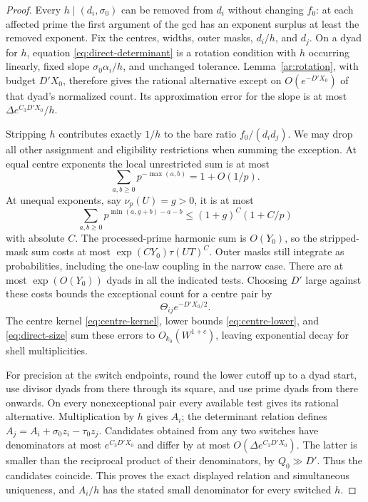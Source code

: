 \begin{proof}
Every $h\mid(d_i,\sigma_0)$ can be removed from $d_i$ without changing
$f_0$: at each affected prime the first argument of the gcd has an exponent
surplus at least the removed exponent. Fix the centres, widths, outer
masks, $d_i/h$, and $d_j$. On a dyad for $h$, equation
\eqref{eq:direct-determinant} is a rotation condition with $h$ occurring
linearly, fixed slope $\sigma_0\alpha_i/h$, and unchanged tolerance.
Lemma~\ref{ar:rotation}, with budget $D'X_0$, therefore gives the
rational alternative except on $O(e^{-D'X_0})$ of that dyad's normalized
count. Its approximation error for the slope is at most
$\Delta e^{C_3D'X_0}/h$.

Stripping $h$ contributes exactly $1/h$ to the bare ratio
$f_0/(d_i d_j)$. We may drop all other assignment and eligibility
restrictions when summing the exception. At equal centre exponents the
local unrestricted sum is at most
\[
 \sum_{a,b\ge0}p^{-\max(a,b)}=1+O(1/p).
\]
At unequal exponents, say $\nu_p(U)=g>0$, it is at most
\[
 \sum_{a,b\ge0}p^{\min(a,g+b)-a-b}
       \le (1+g)^C(1+C/p)
\]
with absolute $C$. The processed-prime harmonic sum is $O(Y_0)$, so the
stripped-mask sum costs at most
$\exp(CY_0)\tau(UT)^C$. Outer masks still integrate as probabilities,
including the one-law coupling in the narrow case. There are at most
$\exp(O(Y_0))$ dyads in all the indicated tests. Choosing $D'$ large
against these costs bounds the exceptional count for a centre pair by
\[
 \Theta_{ij}e^{-D'X_0/2}.
\]
The centre kernel \eqref{eq:centre-kernel}, lower bounds
\eqref{eq:centre-lower}, and \eqref{eq:direct-size} sum these errors to
$O_{k_0}(W^{1+c})$, leaving exponential decay for shell multiplicities.

For precision at the switch endpoints, round the lower cutoff up to a
dyad start, use divisor dyads from there through its square, and use prime
dyads from there onwards. On every nonexceptional pair every available
test gives its rational alternative. Multiplication by $h$ gives $A_i$;
the determinant relation defines
$A_j=A_i+\sigma_0z_i-\tau_0z_j$. Candidates obtained from any two
switches have denominators at most $e^{C_3D'X_0}$ and differ by at most
$O(\Delta e^{C_3D'X_0})$. The latter is smaller than the reciprocal
product of their denominators, by $Q_0\gg D'$. Thus the candidates
coincide. This proves the exact displayed relation and simultaneous
uniqueness, and $A_i/h$ has the stated small denominator for every
switched $h$.


\end{proof}
